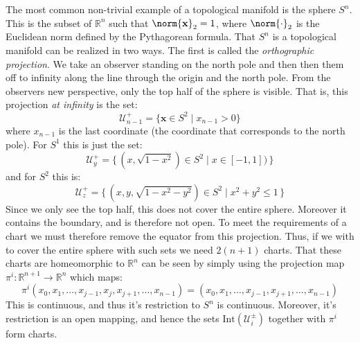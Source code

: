 \documentclass{article}                                                        %
\begin{document}
        \begin{example}
            The most common non-trivial example of a topological manifold is
            the sphere $S^{n}$. This is the subset of $\mathbb{R}^{n}$ such that
            $\norm{\mathbf{x}}_{2}=1$, where $\norm{\cdot}_{2}$ is the Euclidean
            norm defined by the Pythagorean formula. That $S^{n}$ is a
            topological manifold can be realized in two ways. The first is
            called the \textit{orthographic projection}. We take an observer
            standing on the north pole and then then them off to infinity along
            the line through the origin and the north pole. From the observers
            new perspective, only the top half of the sphere is visible. That
            is, this projection \textit{at infinity} is the set:
            \begin{equation}
                \mathcal{U}_{n-1}^{+}=\big\{\mathbf{x}\in{S}^{2}\;|\;x_{n-1}>0\}
            \end{equation}
            where $x_{n-1}$ is the last coordinate (the coordinate that
            corresponds to the north pole). For $S^{1}$ this is just the set:
            \begin{equation}
                \mathcal{U}_{y}^{+}=
                    \{\,(x,\sqrt{1-x^{2}})\in{S}^{2}\;|\;x\in[-1,1])\,\}
            \end{equation}
            and for $S^{2}$ this is:
            \begin{equation}
                \mathcal{U}_{z}^{+}=
                    \{\,(x,y,\sqrt{1-x^{2}-y^{2}})\in{S}^{2}\;
                    |\;x^{2}+y^{2}\leq{1}\,\}
            \end{equation}
            Since we only see the top half, this does not cover the entire
            sphere. Moreover it contains the boundary, and is therefore not
            open. To meet the requirements of a chart we must therefore remove
            the equator from this projection. Thus, if we with to cover the
            entire sphere with such sets we need $2(n+1)$ charts. That these
            charts are homeomorphic to $\mathbb{R}^{n}$ can be seen by simply
            using the projection map
            $\pi^{i}:\mathbb{R}^{n+1}\rightarrow\mathbb{R}^{n}$ which maps:
            \begin{equation}
                \pi^{i}(x_{0},x_{1},\dots,x_{j-1},x_{j},x_{j+1},\dots,x_{n-1})
                =(x_{0},x_{1},\dots,x_{j-1},x_{j+1},\dots,x_{n-1})
            \end{equation}
            This is continuous, and thus it's restriction to $S^{n}$ is
            continuous. Moreover, it's restriction is an open mapping, and hence
            the sets $\textrm{Int}(\mathcal{U}_{i}^{\pm})$ together with
            $\pi^{i}$ form charts.
        \end{example}
\end{document}
